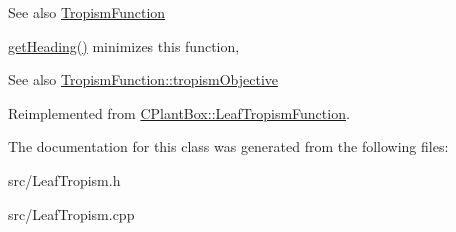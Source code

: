 \begin{DoxySeeAlso}{See also}
\hyperlink{classCPlantBox_1_1TropismFunction}{Tropism\+Function}
\end{DoxySeeAlso}
\hyperlink{classCPlantBox_1_1LeafTropismFunction_a1440868221a834474e34e3a503a74572}{get\+Heading()} minimizes this function, \begin{DoxySeeAlso}{See also}
\hyperlink{classCPlantBox_1_1TropismFunction_a4f2c79fff55d1398c98a070dd8ebbe08}{Tropism\+Function\+::tropism\+Objective} 
\end{DoxySeeAlso}


Reimplemented from \hyperlink{classCPlantBox_1_1LeafTropismFunction_ab89f5f7e80103d80681bc8cadc220dba}{C\+Plant\+Box\+::\+Leaf\+Tropism\+Function}.



The documentation for this class was generated from the following files\+:\begin{DoxyCompactItemize}
\item 
src/Leaf\+Tropism.\+h\item 
src/Leaf\+Tropism.\+cpp\end{DoxyCompactItemize}
